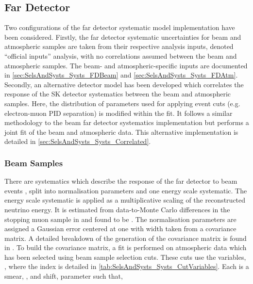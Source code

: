 \subsection{Far Detector}
\label{sec:SelsAndSysts_Systs_FD}

Two configurations of the far detector systematic model implementation have been considered. Firstly, the far detector systematic uncertainties for beam and atmospheric samples are taken from their respective analysis inputs, denoted ``official inputs'' analysis, with no correlations assumed between the beam and atmospheric samples. The beam- and atmospheric-specific inputs are documented in \autoref{sec:SelsAndSysts_Systs_FDBeam} and \autoref{sec:SelsAndSysts_Systs_FDAtm}. Secondly, an alternative detector model has been developed which correlates the response of the SK detector systematics between the beam and atmospheric samples. Here, the distribution of parameters used for applying event cuts (e.g. electron-muon PID separation) is modified within the fit. It follows a similar methodology to the beam far detector systematics implementation but performs a joint fit of the beam and atmospheric data. This alternative implementation is detailed in \autoref{sec:SelsAndSysts_Systs_Correlated}.

\subsubsection{Beam Samples}
\label{sec:SelsAndSysts_Systs_FDBeam}


There are  systematics which describe the response of the far detector to beam events \cite{t2k_tn_399}, split into  normalisation parameters and one energy scale systematic. The energy scale systematic is applied as a multiplicative scaling of the reconstructed neutrino energy. It is estimated from data-to-Monte Carlo differences in the stopping muon sample in \cite{Kamiokande_Collaboration2017-nf} and found to be . The normalisation parameters are assigned a Gaussian error centered at one with width taken from a covariance matrix. A detailed breakdown of the generation of the covariance matrix is found in \cite{t2k_tn_318}. To build the covariance matrix, a fit is performed on atmospheric data which has been selected using beam sample selection cuts. These cuts use the variables, , where the index  is detailed in \autoref{tab:SelsAndSysts_Systs_CutVariables}. Each  is a smear, \quickmath{\alpha}, and shift, \quickmath{\beta} parameter such that,

